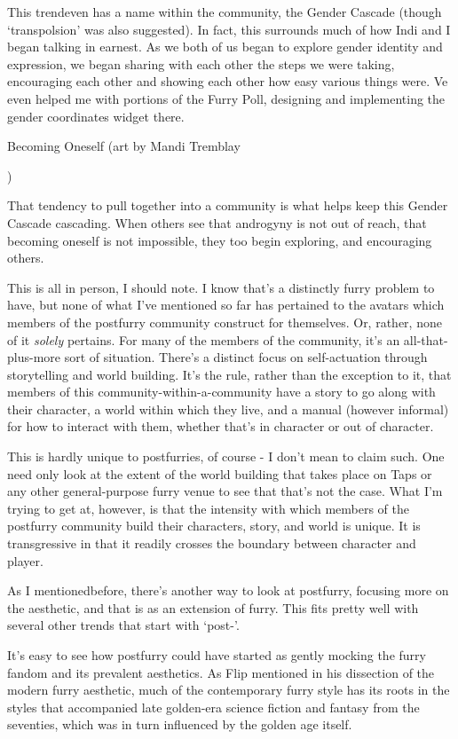 This trendeven has a name within the community, the Gender Cascade (though `transpolsion' was also suggested).{ }In fact, this surrounds much of how Indi and I began talking in earnest.{ }As we both of us began to explore gender identity and expression, we began sharing with each other the steps we were taking, encouraging each other and showing each other how easy various things were.{ }Ve even helped me with portions of the Furry Poll, designing and implementing the gender coordinates widget there.

 Becoming Oneself (art by Mandi Tremblay

)

That tendency to pull together into a community is what helps keep this Gender Cascade cascading.{ }When others see that androgyny is not out of reach, that becoming oneself is not impossible, they too begin exploring, and encouraging others.

This is all in person, I should note.{ }I know that's a distinctly furry problem to have, but none of what I've mentioned so far has pertained to the avatars which members of the postfurry community construct for themselves.{ }Or, rather, none of it \emph{solely} pertains.{ }For many of the members of the community, it's an all-that-plus-more sort of situation.{ }There's a distinct focus on self-actuation through storytelling and world building.{ }It's the rule, rather than the exception to it, that members of this community-within-a-community have a story to go along with their character, a world within which they live, and a manual (however informal) for how to interact with them, whether that's in character or out of character.

This is hardly unique to postfurries, of course - I don't mean to claim such.{ }One need only look at the extent of the world building that takes place on Taps or any other general-purpose furry venue to see that that's not the case.{ }What I'm trying to get at, however, is that the intensity with which members of the postfurry community build their characters, story, and world is unique.{ }It is transgressive in that it readily crosses the boundary between character and player.

As I mentionedbefore, there's another way to look at postfurry, focusing more on the aesthetic, and that is as an extension of furry.{ }This fits pretty well with several other trends that start with `post-'.

It's easy to see how postfurry could have started as gently mocking the furry fandom and its prevalent aesthetics.{ }As Flip mentioned in his dissection of the modern furry aesthetic, much of the contemporary furry style has its roots in the styles that accompanied late golden-era science fiction and fantasy from the seventies, which was in turn influenced by the golden age itself.

